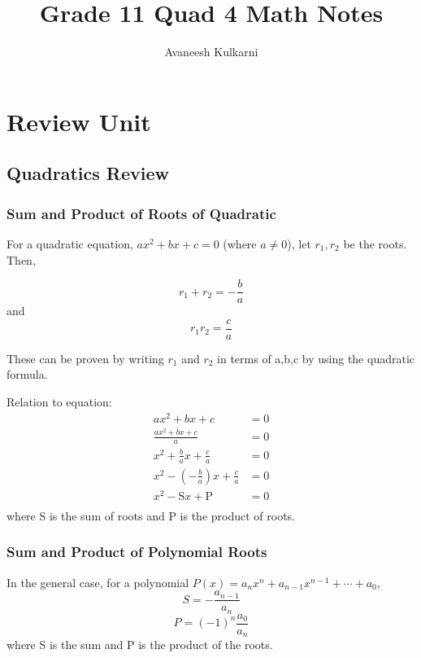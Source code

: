 \documentclass{article}
\title{Grade 11 Quad 4 Math Notes}
\author{Avaneesh Kulkarni}
\date{}
\numberwithin{equation}{section}
\begin{document}
\maketitle
\tableofcontents
\newpage
{}

\section{Review Unit}

\subsection{Quadratics Review}

\subsubsection*{Sum and Product of Roots of Quadratic}
For a quadratic equation, $ax^2 + bx + c = 0$ (where $a \neq 0$),
let $r_1, r_2$ be the roots. Then,

\begin{equation}\label{sumquad}
	r_1 + r_2 = -\frac{b}{a}
\end{equation}
and
\begin{equation}\label{prodquad}
	r_1 r_2 = \frac{c}{a}
\end{equation}

These can be proven by writing $r_1$ and $r_2$ in terms of a,b,c by using the quadratic formula.

Relation to equation:
\begin{align*}
	ax^2 + bx + c &= 0 \\ 
	\frac{ax^2 + bx + c}{a} &= 0 \\ 
	x^2 + \frac{b}{a}x + \frac{c}{a} &= 0 \\ 
	x^2 - \left( - \frac{b}{a} \right) x + \frac{c}{a} &= 0 \\ 
	x^2 - \mathrm{S} x + \mathrm{P} &= 0 \\
\end{align*}
where S is the sum of roots and P is the product of roots.

\subsubsection*{Sum and Product of Polynomial Roots}
In the general case, for a polynomial $P(x) = a_nx^n + a_{n-1}x^{n-1} + \dotsb + a_0 $,
\begin{equation}
	S = - \frac{a_{n-1}}{a_n}
\end{equation}
\begin{equation}
	P = (-1)^n \frac{a_0}{a_n}
\end{equation}
where S is the sum and P is the product of the roots.
\end{document}
